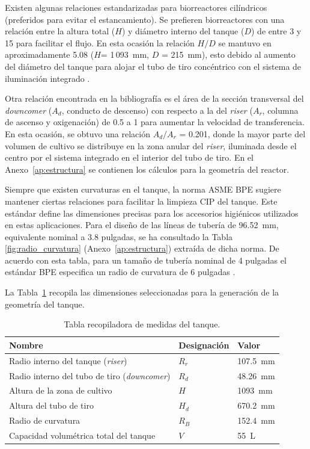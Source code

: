 Existen algunas relaciones estandarizadas para biorreactores cilíndricos
(preferidos para evitar el estancamiento). Se prefieren biorreactores con una
relación entre la altura total ($H$) y diámetro interno del tanque
($D$) de entre 3 y 15 para facilitar el flujo. En esta ocasión la
relación $H/D$ se mantuvo en aproximadamente 5.08 ($H $= 1\,093~mm, $D$ = 215~mm),
esto debido al aumento del diámetro del tanque para alojar el tubo de tiro concéntrico
con el sistema de iluminación integrado \cite{Moresi2025}.

Otra relación encontrada en la bibliografía es el área de la sección transversal del
\textit{downcomer} ($A_d$, conducto de descenso) con respecto a la del \textit{riser} ($A_r$, columna de
ascenso y oxigenación) de 0.5 a 1 para aumentar la velocidad de transferencia. En
esta ocasión, se obtuvo una relación $A_d/A_r$ = 0.201, donde la mayor parte del volumen
de cultivo se distribuye en la zona anular del \textit{riser}, iluminada desde el centro
por el sistema integrado en el interior del tubo de tiro. En el Anexo~\ref{ap:estructura} se contienen los cálculos para la geometría
del reactor.

Siempre que existen curvaturas en el tanque, la norma ASME BPE sugiere
mantener ciertas relaciones para facilitar la limpieza CIP del tanque. Este estándar
define las dimensiones precisas para los accesorios higiénicos utilizados en estas
aplicaciones. Para el diseño de las líneas de tubería de 96.52~mm, equivalente nominal
a 3.8 pulgadas, se ha consultado la Tabla \ref{fig:radio_curvatura} (Anexo~\ref{ap:estructura}) extraída de dicha norma. De acuerdo con esta
tabla, para un tamaño de tubería nominal de 4 pulgadas el estándar BPE especifica
un radio de curvatura de 6 pulgadas \cite{Huitt2016}.

La Tabla~\ref{tab:medidas_tanque} recopila las dimensiones seleccionadas para la generación de la
geometría del tanque.

\begin{table}[H]
\centering
\caption{Tabla recopiladora de medidas del tanque.}
\label{tab:medidas_tanque}
\renewcommand{\arraystretch}{1.3}
\small
\begin{tabularx}{\textwidth}{@{} X l l @{}}
\toprule
\textbf{Nombre} & \textbf{Designación} & \textbf{Valor} \\
\midrule
Radio interno del tanque (\textit{riser}) & $R_r$ & 107.5~mm \\
Radio interno del tubo de tiro (\textit{downcomer}) & $R_d$ & 48.26~mm \\
Altura de la zona de cultivo & $H$ & 1093~mm \\
Altura del tubo de tiro  & $H_d$ & 670.2~mm \\
Radio de curvatura       & $R_B$ & 152.4~mm \\
Capacidad volumétrica total del tanque & $V$ & 55~L \\
\bottomrule
\end{tabularx}
\end{table}

